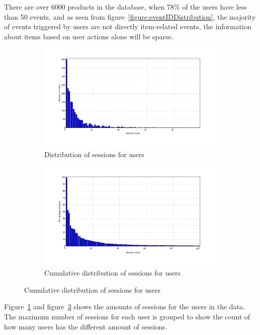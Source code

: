         There are over 6000 products in the database, when 78\% of the users have less than 50 events, and as seen from figure~\ref{figure:eventIDDistribution}, the majority of events triggered by users are not directly item-related events, the information about items based on user actions alone will be sparse.

    \begin{figure}[H]
        \centering
        \begin{subfigure}{.5\textwidth}
            \centering
            \includegraphics[width=\dualGraphWidth]{image/sessionsCountdistribution.png}
            \caption{Distribution of sessions for users}
    \label{figure:sessCountDist}
        \end{subfigure}%
        \begin{subfigure}{.5\textwidth}
            \centering
            \includegraphics[width=\dualGraphWidth]{image/sessioncumdistribution.png}
            \caption{Cumulative distribution of sessions for users}
    \label{figure:sessCountCumDist}
        \end{subfigure}
    \end{figure}
        Figure~\ref{figure:sessCountDist} and figure~\ref{figure:sessCountCumDist} shows the amounts of sessions for the users in the data.
        The maximum number of sessions for each user is grouped to show the count of how many users has the different amount of sessions.

